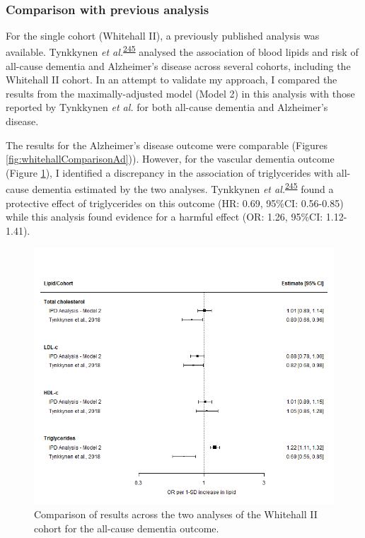 \documentclass[a4paper, twoside]{templates/ociamthesis}
\begin{document}
~

\hypertarget{comparison-with-previous-analysis}{%
\subsubsection{Comparison with previous analysis}\label{comparison-with-previous-analysis}}

For the single cohort (Whitehall II), a previously published analysis was available. Tynkkynen \emph{et al.}\textsuperscript{\protect\hyperlink{ref-tynkkynen2018}{245}} analysed the association of blood lipids and risk of all-cause dementia and Alzheimer's disease across several cohorts, including the Whitehall II cohort. In an attempt to validate my approach, I compared the results from the maximally-adjusted model (Model 2) in this analysis with those reported by Tynkkynen \emph{et al.} for both all-cause dementia and Alzheimer's disease.

The results for the Alzheimer's disease outcome were comparable (Figures \ref{fig:whitehallComparisonAd})). However, for the vascular dementia outcome (Figure \ref{fig:whitehallComparisonDementia}), I identified a discrepancy in the association of triglycerides with all-cause dementia estimated by the two analyses. Tynkkynen \emph{et al.}\textsuperscript{\protect\hyperlink{ref-tynkkynen2018}{245}} found a protective effect of triglycerides on this outcome (HR: 0.69, 95\%CI: 0.56-0.85) while this analysis found evidence for a harmful effect (OR: 1.26, 95\%CI: 1.12-1.41).





\begin{figure}[H]
\includegraphics[width=1\linewidth]{figures/ipd/whitehall_comparison_dementia} \caption[Comparison of results across the two analyses of the Whitehall II cohort]{Comparison of results across the two analyses of the Whitehall II cohort for the all-cause dementia outcome.}\label{fig:whitehallComparisonDementia}
\end{figure}
\end{document}
